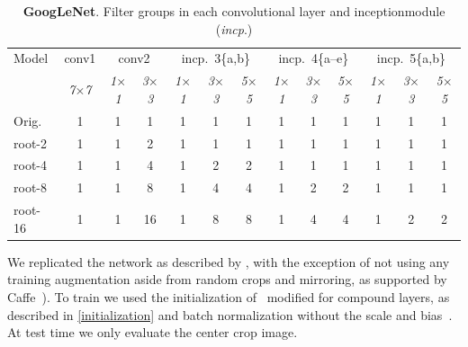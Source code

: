 \documentclass[thesis]{subfiles}
\begin{document}
	\begin{table}[tp]
		\caption[GoogLeNet root architectures]{\textbf{GoogLeNet}. Filter groups in each convolutional layer and \Gls{inception}\index module (\textit{incp}.)}
		\label{table:googlenetconfig}
		\centering
		\begin{tabular}{@{}lcccccccccccc@{}}
			\toprule
			Model & conv1 & \multicolumn{2}{c}{conv2} & \multicolumn{3}{c}{incp.~3\{a,b\}} & \multicolumn{3}{c}{incp.~4\{a--e\}} & \multicolumn{3}{c}{incp.~5\{a,b\}} \\
			& \textit{\footnotesize7$\times$7} & \textit{\footnotesize1$\times$1} & \textit{\footnotesize3$\times$3} & \textit{\footnotesize1$\times$1} & \textit{\footnotesize3$\times$3} & \textit{\footnotesize5$\times$5} & \textit{\footnotesize1$\times$1} & \textit{\footnotesize3$\times$3} & \textit{\footnotesize5$\times$5} & \textit{\footnotesize1$\times$1} & \textit{\footnotesize3$\times$3} & \textit{\footnotesize5$\times$5} \\
			Orig. & 1 &  1 &  1 & 1 & 1 & 1 & 1 & 1 & 1 & 1 & 1 & 1\\ 
			\midrule
			root-2 & 1 &  1 &  2 & 1 & 1 & 1 & 1 & 1 & 1 & 1 & 1 & 1\\
			root-4 & 1 &  1 &  4 & 1 & 2 & 2 & 1 & 1 & 1 & 1 & 1 & 1\\
			root-8 & 1 &  1 &  8 & 1 & 4 & 4 & 1 & 2 & 2 & 1 & 1 & 1\\
			root-16 & 1 &  1 & 16 & 1 & 8 & 8 & 1 & 4 & 4 & 1 & 2 & 2\\
			\bottomrule
		\end{tabular}
	\end{table}
	
	We replicated the network as described by \citet{Szegedy2014going}, with the exception of not using any training augmentation aside from random crops and mirroring, as supported by Caffe~\citep{Jia2014}). To train we used the initialization of~\citep{He2015b} modified for compound layers, as described in \cref{initialization} and batch normalization without the scale and bias~\citep{Ioffe2015}. At test time we only evaluate the center crop image.
	
\end{document}
